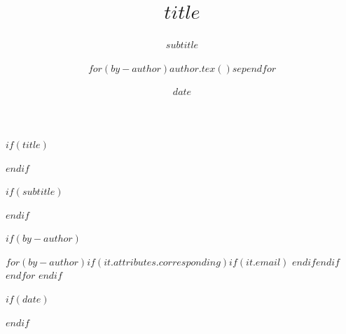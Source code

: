 $if(title)$
\title{$title$}
$endif$

$if(subtitle)$
\subtitle{$subtitle$}
$endif$

$if(by-author)$
\author{$for(by-author)$$author.tex()$$sep$\hspace{2em}$endfor$}
$for(by-author)$$if(it.attributes.corresponding)$$if(it.email)$
$endif$$endif$$endfor$
$endif$

$if(date)$
\date{$date$}
$endif$
